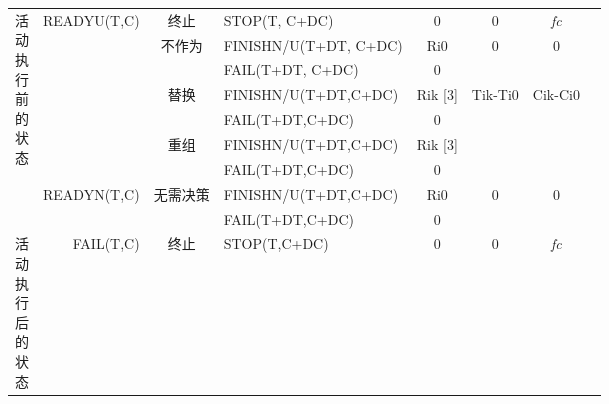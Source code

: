 \begin{table}[htbp]
\begin{tabular}{rrrrrrrr}
        \multicolumn{1}{c}{\multirow{9}[18]{*}{\parbox{1em}{活\\动\\执\\行\\前\\的\\状\\态}}} & \multirow{7}[14]{*}{READYU(T,C)} & \multicolumn{1}{c}{终止} & \multicolumn{1}{l}{STOP(T, C+DC)} & \multicolumn{1}{c}{0} & \multicolumn{1}{c}{0} & \multicolumn{1}{c}{\textit{fc}} \\
        \multicolumn{1}{c}{} &       & \multicolumn{1}{c}{\multirow{2}[4]{*}{不作为}} & \multicolumn{1}{l}{FINISHN/U(T+DT, C+DC)} & \multicolumn{1}{c}{Ri0} & \multicolumn{1}{c}{\multirow{2}[4]{*}{0}} & \multicolumn{1}{c}{\multirow{2}[4]{*}{0}} \\
        \multicolumn{1}{c}{} &       & \multicolumn{1}{c}{} & \multicolumn{1}{l}{FAIL(T+DT, C+DC)} & \multicolumn{1}{c}{0} & \multicolumn{1}{c}{} & \multicolumn{1}{c}{} \\
        \multicolumn{1}{c}{} &       & \multicolumn{1}{c}{\multirow{2}[4]{*}{替换}} & \multicolumn{1}{l}{FINISHN/U(T+DT,C+DC)} & \multicolumn{1}{c}{Rik  [3]} & \multicolumn{1}{c}{\multirow{2}[4]{*}{Tik-Ti0}} & \multicolumn{1}{c}{\multirow{2}[4]{*}{Cik-Ci0}} \\
        \multicolumn{1}{c}{} &       & \multicolumn{1}{c}{} & \multicolumn{1}{l}{FAIL(T+DT,C+DC)} & \multicolumn{1}{c}{0} & \multicolumn{1}{c}{} & \multicolumn{1}{c}{} \\
        \multicolumn{1}{c}{} &       & \multicolumn{1}{c}{\multirow{2}[4]{*}{重组}} & \multicolumn{1}{l}{FINISHN/U(T+DT,C+DC)} & \multicolumn{1}{c}{Rik  [3]} & \multirow{2}[4]{*}{} & \multicolumn{1}{c}{\multirow{2}[4]{*}{}} \\
        \multicolumn{1}{c}{} &       & \multicolumn{1}{c}{} & \multicolumn{1}{l}{FAIL(T+DT,C+DC)} & \multicolumn{1}{c}{0} &       & \multicolumn{1}{c}{} \\
        \multicolumn{1}{c}{} & \multirow{2}[4]{*}{READYN(T,C)} & \multicolumn{1}{c}{\multirow{2}[4]{*}{无需决策}} & \multicolumn{1}{l}{FINISHN/U(T+DT,C+DC)} & \multicolumn{1}{c}{Ri0} & \multicolumn{1}{c}{\multirow{2}[4]{*}{0}} & \multicolumn{1}{c}{\multirow{2}[4]{*}{0}} \\
        \multicolumn{1}{c}{} &       & \multicolumn{1}{c}{} & \multicolumn{1}{l}{FAIL(T+DT,C+DC)} & \multicolumn{1}{c}{0} & \multicolumn{1}{c}{} & \multicolumn{1}{c}{} \\
        \multicolumn{1}{c}{\multirow{11}[22]{*}{\parbox{1em}{活\\动\\执\\行\\后\\的\\状\\态}}} & \multirow{7}[14]{*}{FAIL(T,C)} & \multicolumn{1}{c}{终止} & \multicolumn{1}{l}{STOP(T,C+DC)} & \multicolumn{1}{c}{0} & \multicolumn{1}{c}{0} & \multicolumn{1}{c}{\textit{fc}} \\

\end{tabular}
\end{table}
